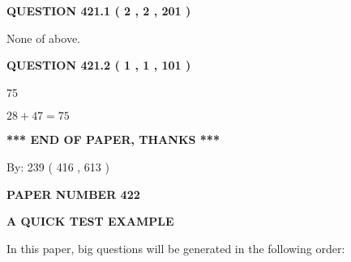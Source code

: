 \documentclass[12pt]{article}
\begin{document}
{\textbf{\Large{QUESTION
421.1 
 ( 2 , 2 , 201 )
}}}
  
  
 
 
\noindent{}
 
 
 None of above.
 
 
 
 
  
\vspace{0.2in}
  
{\textbf{\Large{QUESTION
421.2 
 ( 1 , 1 , 101 )
}}}
  
  
 
 
\noindent{}

75
 
 
 
 
\noindent{}

$ %
28 +  %
47=   %
75$
 
 
   
   
 \vspace{0.2in}
 
   
   
   
   
\vspace{1.0in} 
{\textbf{\large{ *** END OF PAPER, THANKS *** }}} 
   
   
\hspace{1.0in} By: 
 239 ( 416 ,  613 )
   
   
   
   
\newpage 
\setcounter{page}{ 
   422001 } 
   
   
   
   
 {\textbf{ \Large{ PAPER NUMBER  422  }}}
   
   
\vspace{0.2in}
   
   
   
   
   
   
 \vspace{0.2in}
{\LARGE {\textbf{ A QUICK TEST EXAMPLE}}}
   
   
   
\vspace{0.2in}
   
In this paper, big questions will be generated in the following order: 
   
\end{document}
